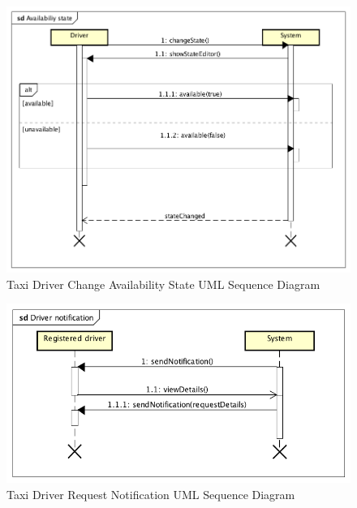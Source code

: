 \documentclass[a4paper]{article}
\begin{document}
\begin{figure}[H]
\includegraphics[width=\sequenceWidth]{Sequence-TaxiDriver-ChangeAvailabilityState}
\centering
\caption{Taxi Driver Change Availability State UML Sequence Diagram}
\label{fig:sequencetaxidriverchangestate}
\end{figure}

\begin{figure}[H]
\includegraphics[width=\sequenceWidth]{Sequence-TaxiDriver-Notification}
\centering
\caption{Taxi Driver Request Notification UML Sequence Diagram}
\label{fig:sequencetaxidrivernotification}
\end{figure}
\end{document}
